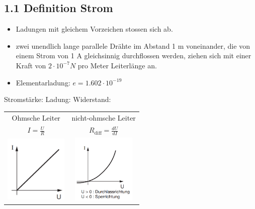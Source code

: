 \subsection*{1.1 Definition Strom}

\begin{itemize}
    \item Ladungen mit gleichem Vorzeichen stossen sich ab.
    \item zwei unendlich lange parallele Drähte im Abstand 1 m voneinander, die von einem Strom von 1 A gleichsinnig durchflossen werden, ziehen sich mit einer Kraft von $2 \cdot 10^{-7} N$ pro Meter Leiterlänge an.
    \item Elementarladung: $e = 1.602 \cdot 10^{-19}$
\end{itemize}


Stromstärke: 
Ladung: 
Widerstand: 

\begin{tabular}{c c}
    Ohmsche Leiter & nicht-ohmsche Leiter \\
    $I = \frac{U}{R}$ & $R_{\text{diff}} = \frac{dU}{dI}$\\
    \includegraphics[width = 30mm]{src/images/plot_ohmscher_leiter.png} & \includegraphics[width = 30mm]{src/images/plot_nicht-ohmscher_leiter.png}
\end{tabular}


